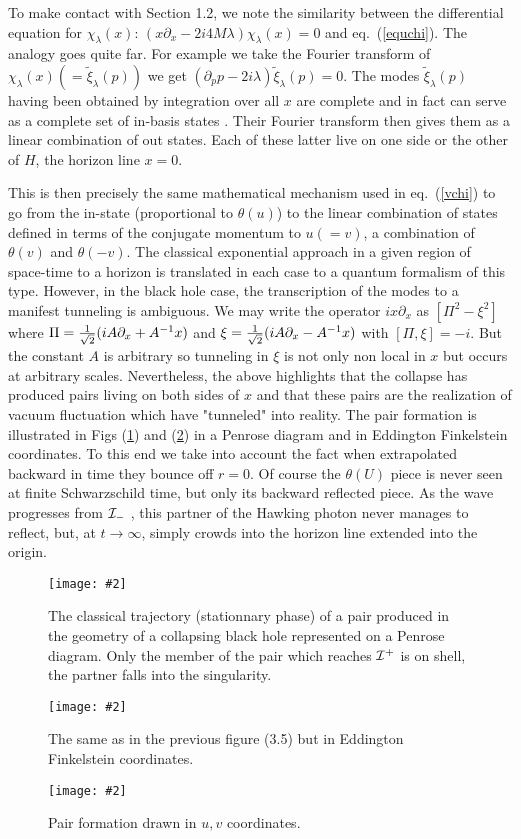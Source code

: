 \documentclass[12pt,oneside]{report}
\newcommand{\dessin}[4]
{\begin{figure}[tp]\begin{center}
\texttt{[image: \#2]}%
\end{center}
\caption{#4}
\label{#3}
\end{figure}}
\begin{document}
To make contact with Section 1.2, we note the similarity between the
differential equation for $ \chi_\lambda (x)$:  $(x \partial_x -2
i 4M \lambda ) \chi_\lambda (x) = 0 $ 
and eq.~(\ref{equchi}). The analogy goes quite
far. For example we take the Fourier transform of $ \chi_\lambda (x)
(=\tilde \xi_\lambda (p))$ we get $ ({\partial_p} p -2 i
\lambda) \tilde \xi_\lambda (p) = 0$. The modes $ \tilde \xi_\lambda ( p )
$ having been obtained by integration over all $x$
 are complete and in fact can
serve as a complete set of in-basis states
\cite{PaBr}. Their Fourier transform then gives
them as a linear combination of out states.
Each of these latter live on one
side or the other of $H$,  the horizon line $ x = 0 $.

This is then precisely the same 
mathematical mechanism used in eq.~(\ref{vchi}) to go from the
in-state (proportional to $ \theta (u)$) to the 
linear combination of states defined
in terms of the conjugate momentum to $ u (=v) $, a combination of
$\theta(v)$ and $ \theta (-v)$. 
The classical exponential approach in a given region
of space-time to a horizon is translated in each case to a quantum
formalism of this type. 
However, in the
black hole case, the transcription of the modes to a manifest tunneling is
ambiguous. We may write the operator $ ix \partial _x $ as $
[\Pi^2 - \xi^2]$ where $ \Pi = {1 \over \sqrt{2}} (iA {
\partial_x} + A^{-1}x )$ and $ \xi = {1 \over \sqrt{2}} (iA {
\partial_x} - A^{-1}x )$  with $ [ \Pi, \xi ] = -i $. But the constant $A$ is
arbitrary so tunneling in $ \xi$ is not only non local in $x$ but occurs at
arbitrary scales. 
Nevertheless, the above highlights that the collapse has produced pairs
living on both sides of $x$
 and that these pairs are the realization of vacuum
fluctuation which have "tunneled" into reality. The pair
formation is illustrated in Figs (\ref{pairpen}) and (\ref{pairedf})  in a
Penrose diagram and in
 Eddington Finkelstein coordinates. To this end we take into account the fact
when extrapolated backward in time they bounce off $ r = 0 $. Of course the $
\theta (U)$ piece is never seen at finite Schwarzschild time, but only its
backward reflected piece. As the wave progresses from $ {\cal I}_-$ , this
partner of the Hawking photon never manages to reflect, but,
at $t \to \infty$, simply crowds into
the horizon line extended into the origin.
\dessin{1.000}{NFIG3-5.eps}{pairpen}{The classical trajectory (stationnary phase) of a pair
produced in the geometry of a collapsing black hole represented on a Penrose
diagram. Only the member of the pair which reaches ${\cal I}^+$ is on shell,
the partner falls into the singularity.}
\newpage 
\dessin{1.000}{NFIG3-6.eps}{pairedf}{The same as in the previous figure (3.5)
 but in Eddington Finkelstein coordinates.} 
\dessin{1.000}{NFIG3-7.eps}{pairuv}{Pair
formation drawn in $u,v$ coordinates.}
\end{document}
